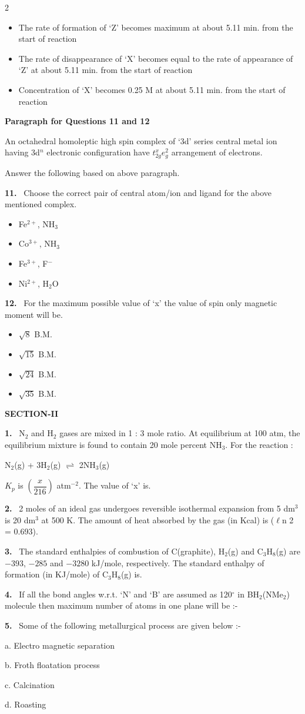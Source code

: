\documentclass[10pt]{extarticle}
\newcommand{\sect}[1]{\par\smallskip\noindent\textbf{#1}\par}
\newcommand{\qn}[1]{\par\smallskip\noindent\textbf{#1.}~}
\newcommand{\paraq}[2]{\par\smallskip\noindent\textbf{Paragraph for Questions #1 and #2}\par}
\newenvironment{qoptions}{\begin{itemize}[leftmargin=1.8em,itemsep=1pt,topsep=2pt,label={}]}{\end{itemize}}
\newcommand{\opt}[2]{\item[(#1)] #2}
\begin{document}
\begin{multicols}{2}
\begin{qoptions}
\opt{B}{The rate of formation of `Z' becomes maximum at about 5.11 min. from the start of reaction}
\opt{C}{The rate of disappearance of `X' becomes equal to the rate of appearance of `Z' at about 5.11 min. from the start of reaction}
\opt{D}{Concentration of `X' becomes 0.25 M at about 5.11 min. from the start of reaction}
\end{qoptions}
\paraq{11}{12}
An octahedral homoleptic high spin complex of `3d' series central metal ion having 3d$^n$ electronic configuration have $t_{2g}^{x}e_g^2$ arrangement of electrons.\par
Answer the following based on above paragraph.
\qn{11} Choose the correct pair of central atom/ion and ligand for the above mentioned complex.
\begin{qoptions}
\opt{A}{Fe$^{2+}$, NH$_3$}
\opt{B}{Co$^{3+}$, NH$_3$}
\opt{C}{Fe$^{3+}$, F$^{-}$}
\opt{D}{Ni$^{2+}$, H$_2$O}
\end{qoptions}
\qn{12} For the maximum possible value of `x' the value of spin only magnetic moment will be.
\begin{qoptions}
\opt{A}{$\sqrt8$ B.M.}
\opt{B}{$\sqrt{15}$ B.M.}
\opt{C}{$\sqrt{24}$ B.M.}
\opt{D}{$\sqrt{35}$ B.M.}
\end{qoptions}
\sect{SECTION-II}
\qn{1} N$_2$ and H$_2$ gases are mixed in 1 : 3 mole ratio. At equilibrium at 100 atm, the equilibrium mixture is found to contain 20 mole percent NH$_3$. For the reaction :\par
N$_2$(g) + 3H$_2$(g) $\rightleftharpoons$ 2NH$_3$(g)\par
$K_p$ is $\left(\dfrac{x}{216}\right)$ atm$^{-2}$. The value of `x' is.
\qn{2} 2 moles of an ideal gas undergoes reversible isothermal expansion from 5 dm$^3$ is 20 dm$^3$ at 500 K. The amount of heat absorbed by the gas (in Kcal) is ($\ell$n 2 = 0.693).
\qn{3} The standard enthalpies of combustion of C(graphite), H$_2$(g) and C$_3$H$_8$(g) are $-393$, $-285$ and $-3280$ kJ/mole, respectively. The standard enthalpy of formation (in KJ/mole) of C$_3$H$_8$(g) is.
\qn{4} If all the bond angles w.r.t. `N' and `B' are assumed as 120$^\circ$ in BH$_2$(NMe$_2$) molecule then maximum number of atoms in one plane will be :-
\qn{5} Some of the following metallurgical process are given below :-\par
a. Electro magnetic separation\par
b. Froth floatation process\par
c. Calcination\par
d. Roasting\par

\end{multicols}
\end{document}
